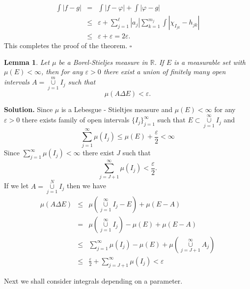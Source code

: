 \documentclass[12pt]{report}
\newtheorem{lemma}[theorem]{Lemma}
\begin{document}
\begin{eqnarray*}
\int |f - g| &=& \int |f - \varphi| + \int |\varphi - g|\\ &\le& \varepsilon +
\sum^\ell_{j=1} |a_j| \sum^{m_j}_{k=1} \int |\chi_{I_{jk}} - h_{jk} |\\ &\le&
 \varepsilon + \varepsilon = 2 \varepsilon.
\end{eqnarray*} This completes the proof of the theorem.  $\square$



\begin{lemma}  Let $\mu$ be a Borel-Stieljes measure in
$\mathbb{R}$.  If $E$ is a measurable set with $\mu(E) < \infty$, then for
any $\varepsilon > 0$ there exist a union of finitely  many open intervals
$A =
\overset{m}{\underset{j=1}{\cup}} I_j$ such that
\[
\mu(A \Delta E) < \varepsilon.
\]
\end{lemma}

\vspace{.5cm}
\noindent
\textbf{Solution.}  Since $\mu$ is a Lebesgue - Stieltjes measure  and
$\mu(E) < \infty$ for any $\varepsilon > 0 $ there exists family of open
intervals
$\{I_j\}^\infty_{j=1}$ such that $E \subset
\overset{\infty}{\underset{j=1}{\cup}}  I_j$ and
\[
\sum^\infty_{j=1} \mu(I_j) \le \mu(E) + \frac{\varepsilon}{2} < 
\infty
\] Since $\sum\limits^\infty_{j=1} \mu(I_j) < \infty$ there exist $J$  such
that
\[
\sum^\infty_{j = J+ 1} \mu(I_j) < \frac{\varepsilon}{2}.
\] If we let $A = \overset{N}{\underset{j=1}{\cup}} I_j$ then we have
\begin{eqnarray*}
\mu(A \Delta E) &\le& \mu \left ( \overset{\infty}{\underset{j=1}{\cup}}
I_j - E\right ) + \mu (E-A)\\  &=& \mu \left (
\overset{\infty}{\underset{j=1}{\cup}} I_j\right ) - \mu(E) + \mu(E-A)\\
 &\le& \sum^\infty_{j=1} \mu(I_j) - \mu(E) + \mu \left (
\overset{\infty}{\underset{j= J+1}{\cup}} A_j
\right )\\ &\le& \frac{\varepsilon}{2} + \sum^\infty_{j = J + 1} \mu(I_j) <
\varepsilon
\end{eqnarray*}

Next we shall consider integrals depending on a parameter.
\end{document}
